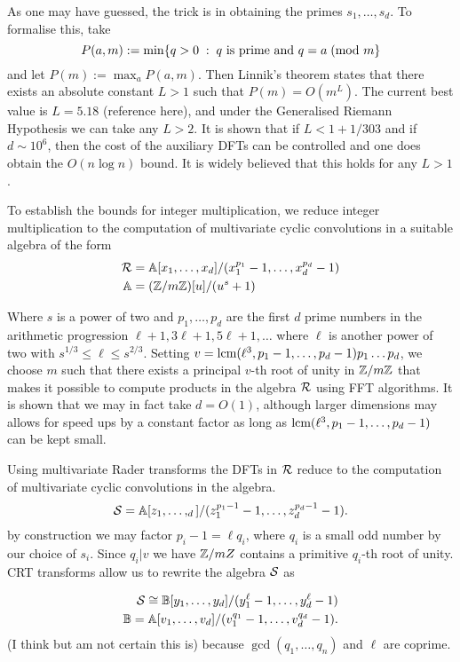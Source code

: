 As one may have guessed, the trick is in obtaining the primes $s_1, \ldots, s_d$. To formalise this, take
\[
    P(a, m) := \min\{q > 0\;:\; q \textrm{ is prime and } q = a \;(\textrm{mod } m\}
\]
and let $P(m) := \max_a P(a, m)$. Then Linnik's theorem states that there exists an absolute constant $L > 1$ such that $P(m) = O(m^L)$. The current best value is $L = 5.18$ (reference here), and under the Generalised Riemann Hypothesis we can take any $L > 2$. It is shown \cite{ffnlogn} that if $L < 1 + 1/303$ and if $d \sim 10^6$, then the cost of the auxiliary DFTs can be controlled and one does obtain the $O(n \log n)$ bound. It is widely believed that this holds for any $L > 1$.

To establish the bounds for integer multiplication, we reduce integer multiplication to the computation of multivariate cyclic convolutions in a suitable algebra of the form
\begin{align*}
    \mathcal R &= \mathbb{A}[x_1, \ldots, x_d] / (x_1^{p_1} - 1, \ldots, x_d^{p_d} - 1)\\
    \mathbb{A} &= ({\mathbb Z} / m{\mathbb Z})[u] / (u^s + 1)
\end{align*}

Where $s$ is a power of two and $p_1, \ldots, p_d$ are the first $d$ prime numbers in the arithmetic progression $\ell + 1, 3\ell + 1, 5\ell + 1, \ldots$ where $\ell$ is another power of two with $s^{1/3} \leq \ell \leq s^{2/3}$.  Setting $v = \textrm{lcm}(\ell^3, p_1 - 1, \ldots, p_d - 1)p_1\dots p_d$, we choose $m$ such that there exists a principal $v$-th root of unity in ${\mathbb Z}/m{\mathbb Z}$ that makes it possible to compute products in the algebra $\mathcal R$ using FFT algorithms. It is shown that we may in fact take $d = O(1)$, although larger dimensions may allows for speed ups by a constant factor as long as $\textrm{lcm}(\ell^3, p_1 - 1, \ldots, p_d - 1)$ can be kept small.

Using multivariate Rader transforms the DFTs in $\mathcal R$ reduce to the computation of multivariate cyclic convolutions in the algebra.
\[
    \mathcal S = {\mathbb A}[z_1, \ldots, _d] / (z_1^{p_1 - 1} - 1, \ldots, z_d^{p_d - 1} - 1).
\]
by construction we may factor $p_i - 1 = \ell q_i$, where $q_i$ is a small odd number by our choice of $s_i$. Since $q_i | v$ we have ${\mathbb Z} /mZ$ contains a primitive $q_i$-th root of unity. CRT transforms allow us to rewrite the algebra $\mathcal S$ as

\begin{align*}
    \mathcal S \cong \mathbb{B}[y_1, \ldots, y_d]/(y_1^\ell - 1, \ldots, y_d^\ell - 1)\\
    \mathbb{B} = \mathbb{A}[v_1, \ldots, v_d] / (v_1^{q_1} - 1, \ldots, v_d^{q_d} - 1).
\end{align*}
(I think but am not certain this is) because $\gcd(q_1, \ldots, q_n)$ and $\ell$ are coprime.

